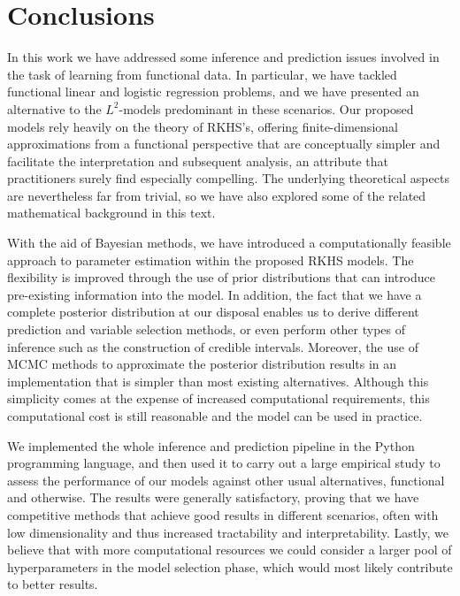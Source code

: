 %
%

\chapter{Conclusions}\label{ch:conclusions}

In this work we have addressed some inference and prediction issues involved in the task of learning from functional data. In particular, we have tackled functional linear and logistic regression problems, and we have presented an alternative to the \(L^2\)-models predominant in these scenarios. Our proposed models rely heavily on the theory of RKHS's, offering finite-dimensional approximations from a functional perspective that are conceptually simpler and facilitate the interpretation and subsequent analysis, an attribute that practitioners surely find especially compelling. The underlying theoretical aspects are nevertheless far from trivial, so we have also explored some of the related mathematical background in this text.

With the aid of Bayesian methods, we have introduced a computationally feasible approach to parameter estimation within the proposed RKHS models. The flexibility is improved through the use of prior distributions that can introduce pre-existing information into the model. In addition, the fact that we have a complete posterior distribution at our disposal enables us to derive different prediction and variable selection methods, or even perform other types of inference such as the construction of credible intervals. Moreover, the use of MCMC methods to approximate the posterior distribution results in an implementation that is simpler than most existing alternatives. Although this simplicity comes at the expense of increased computational requirements, this computational cost is still reasonable and the model can be used in practice.

We implemented the whole inference and prediction pipeline in the Python programming language, and then used it to carry out a large empirical study to assess the performance of our models against other usual alternatives, functional and otherwise. The results were generally satisfactory, proving that we have competitive methods that achieve good results in different scenarios, often with low dimensionality and thus increased tractability and interpretability. Lastly, we believe that with more computational resources we could consider a larger pool of hyperparameters in the model selection phase, which would most likely contribute to better results.

